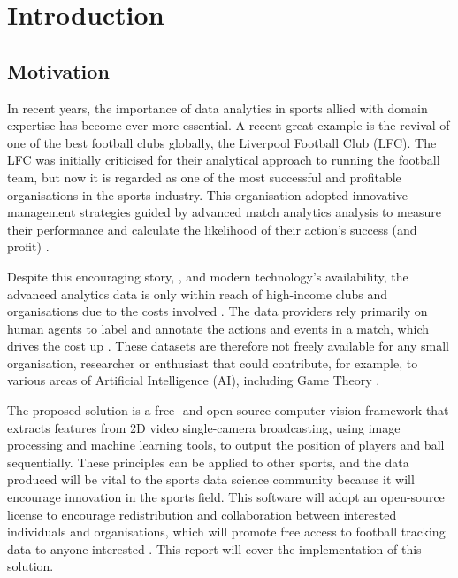 \documentclass[
    11pt,
    oneside
]{report}
\begin{document}
\tableofcontents



\chapter{Introduction}

\section{Motivation}


In recent years, the importance of data analytics in sports allied with domain expertise has become ever more essential. A recent great example is the revival of one of the best football clubs globally, the Liverpool Football Club (LFC). The LFC was initially criticised for their analytical approach to running the football team, but now it is regarded as one of the most successful and profitable organisations in the sports industry. This organisation adopted innovative management strategies guided by advanced match analytics analysis to measure their performance and calculate the likelihood of their action's success (and profit) \cite{liverpool}.


Despite this encouraging story, \cite{liverpool}, and modern technology's availability, the advanced analytics data is only within reach of high-income clubs and organisations due to the costs involved \cite{opta}. The data providers rely primarily on human agents to label and annotate the actions and events in a match, which drives the cost up \cite{opta}. These datasets are therefore not freely available for any small organisation, researcher or enthusiast that could contribute, for example, to various areas of Artificial Intelligence (AI), including Game Theory \cite{deepmind}.


The proposed solution is a free- and open-source computer vision framework that extracts features from 2D video single-camera broadcasting, using image processing and machine learning tools, to output the position of players and ball sequentially. These principles can be applied to other sports, and the data produced will be vital to the sports data science community because it will encourage innovation in the sports field. This software will adopt an open-source license to encourage redistribution and collaboration between interested individuals and organisations, which will promote free access to football tracking data to anyone interested \cite{osd}.  This report will cover the implementation of this solution.
\end{document}

